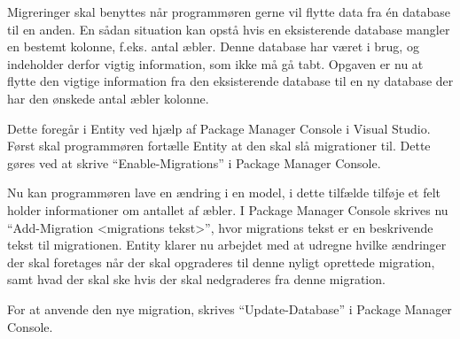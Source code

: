 Migreringer skal benyttes når programmøren gerne vil flytte data fra én database til en anden. En sådan situation kan opstå hvis en eksisterende database mangler en bestemt kolonne, f.eks. antal æbler. Denne database har været i brug, og indeholder derfor vigtig information, som ikke må gå tabt. Opgaven er nu at flytte den vigtige information fra den eksisterende database til en ny database der har den ønskede antal æbler kolonne.

Dette foregår i Entity ved hjælp af Package Manager Console i Visual Studio. Først skal programmøren fortælle Entity at den skal slå migrationer til. Dette gøres ved at skrive \enquote{Enable-Migrations} i Package Manager Console.

Nu kan programmøren lave en ændring i en model, i dette tilfælde tilføje et felt holder informationer om antallet af æbler. I Package Manager Console skrives nu \enquote{Add-Migration <migrations tekst>}, hvor migrations tekst er en beskrivende tekst til migrationen. Entity klarer nu arbejdet med at udregne hvilke ændringer der skal foretages når der skal opgraderes til denne nyligt oprettede migration, samt hvad der skal ske hvis der skal nedgraderes fra denne migration.

For at anvende den nye migration, skrives \enquote{Update-Database} i Package Manager Console.
